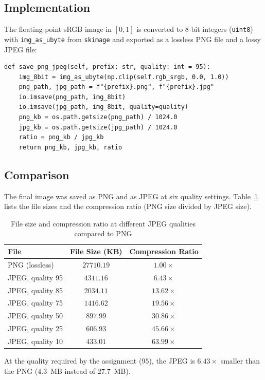 \documentclass[a4paper]{article}
\begin{document}
\subsection{Implementation}
The floating-point sRGB image in $[0, 1]$ is converted to 8-bit integers (\texttt{uint8}) with \texttt{img\_as\_ubyte} from \texttt{skimage} and exported as a lossless PNG file and a lossy JPEG file:
\begin{lstlisting}
def save_png_jpeg(self, prefix: str, quality: int = 95):
    img_8bit = img_as_ubyte(np.clip(self.rgb_srgb, 0.0, 1.0))
    png_path, jpg_path = f"{prefix}.png", f"{prefix}.jpg"
    io.imsave(png_path, img_8bit)
    io.imsave(jpg_path, img_8bit, quality=quality)
    png_kb = os.path.getsize(png_path) / 1024.0
    jpg_kb = os.path.getsize(jpg_path) / 1024.0
    ratio = png_kb / jpg_kb
    return png_kb, jpg_kb, ratio
\end{lstlisting}

\subsection{Comparison}
The final image was saved as PNG and as JPEG at six quality settings. Table~\ref{tab2} lists the file sizes and the compression ratio (PNG size divided by JPEG size).

\begin{table}[H]
\centering
\caption{File size and compression ratio at different JPEG qualities compared to PNG}
\label{tab2}
\begin{tabular}{lcc}
\toprule
\textbf{File} & \textbf{File Size (KB)} & \textbf{Compression Ratio} \\
\midrule
PNG (lossless)     & $27710.19$ & $1.00\times$ \\
JPEG, quality 95   & $4311.16$  & $6.43\times$ \\
JPEG, quality 85   & $2034.11$  & $13.62\times$ \\
JPEG, quality 75   & $1416.62$  & $19.56\times$ \\
JPEG, quality 50   & $897.99$   & $30.86\times$ \\
JPEG, quality 25   & $606.93$   & $45.66\times$ \\
JPEG, quality 10   & $433.01$   & $63.99\times$ \\
\bottomrule
\end{tabular}
\end{table}

At the quality required by the assignment ($95$), the JPEG is $6.43\times$ smaller than the PNG ($4.3$~MB instead of $27.7$~MB).
\end{document}
